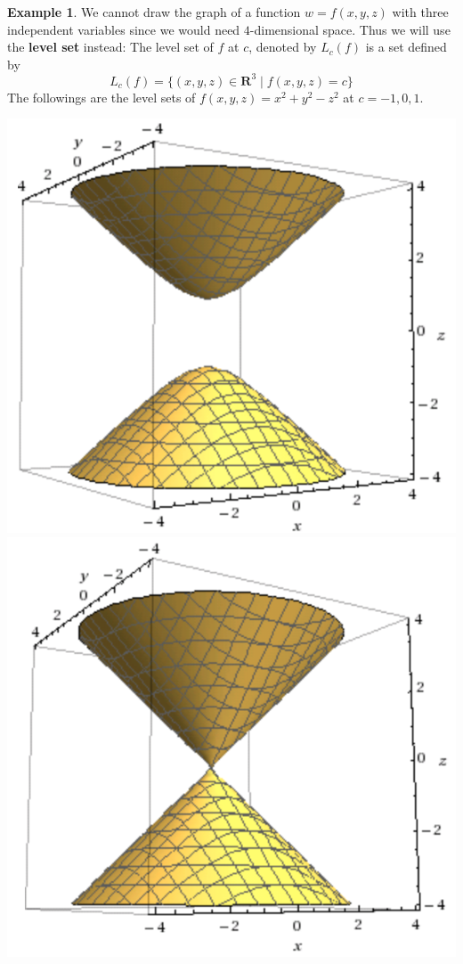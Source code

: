 \documentclass[t]{beamer}
\theoremstyle{plain}
\theoremstyle{definition}
\newtheorem{exmp}[thm]{Example}
\begin{document}
\begin{frame}
\begin{exmp}
	We cannot draw the graph of a function 
	$w=f(x,y,z)$ with three independent variables
	since we would need $4$-dimensional space.
	Thus we will use the \textbf{level set} 
	instead: The level set of $f$ at $c$,
	denoted by $L_c(f)$ is a set defined by
		$$L_c(f)=\{(x,y,z)\in\mathbf R^3\mid
		f(x,y,z)=c\}$$
	The followings are the level sets of 
	$f(x,y,z)=x^2+y^2-z^2$ at $c=-1,0,1$.\\
	\begin{center}
	\includegraphics[scale=.13]{image/week-02-01}
	\includegraphics[scale=.13]{image/week-02-02}

\end{center}
\end{exmp}
\end{frame}
\end{document}
